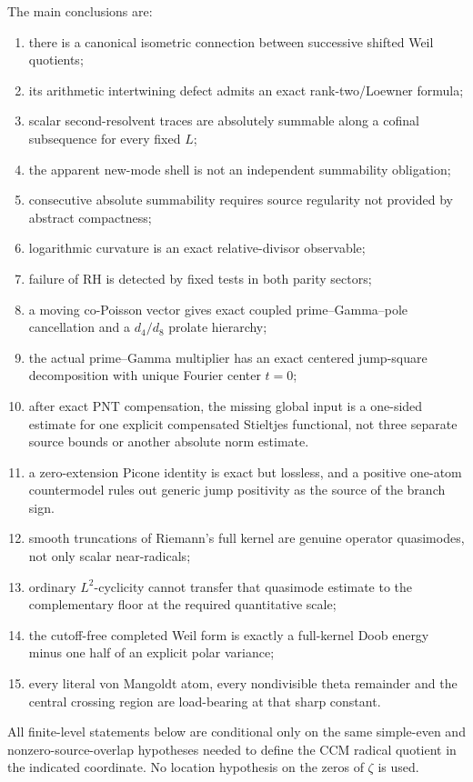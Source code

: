 \documentclass[11pt]{amsart}
\theoremstyle{definition}
\theoremstyle{remark}
\begin{document}
The main conclusions are:
\begin{enumerate}
\item there is a canonical isometric connection between successive shifted
Weil quotients;
\item its arithmetic intertwining defect admits an exact rank-two/Loewner
formula;
\item scalar second-resolvent traces are absolutely summable along a cofinal
subsequence for every fixed \(L\);
\item the apparent new-mode shell is not an independent summability
obligation;
\item consecutive absolute summability requires source regularity not
provided by abstract compactness;
\item logarithmic curvature is an exact relative-divisor observable;
\item failure of RH is detected by fixed tests in both parity sectors;
\item a moving co-Poisson vector gives exact coupled
prime--Gamma--pole cancellation and a \(d_4/d_8\) prolate hierarchy;
\item the actual prime--Gamma multiplier has an exact centered jump-square
decomposition with unique Fourier center \(t=0\);
\item after exact PNT compensation, the missing global input is a one-sided
estimate for one explicit compensated Stieltjes functional, not three
separate source bounds or another absolute norm estimate.
\item a zero-extension Picone identity is exact but lossless, and a
positive one-atom countermodel rules out generic jump positivity as the
source of the branch sign.
\item smooth truncations of Riemann's full kernel are genuine operator
quasimodes, not only scalar near-radicals;
\item ordinary \(L^2\)-cyclicity cannot transfer that quasimode estimate to
the complementary floor at the required quantitative scale;
\item the cutoff-free completed Weil form is exactly a full-kernel
Doob energy minus one half of an explicit polar variance;
\item every literal von Mangoldt atom, every nondivisible theta remainder
and the central crossing region are load-bearing at that sharp constant.
\end{enumerate}

All finite-level statements below are conditional only on the same
simple-even and nonzero-source-overlap hypotheses needed to define the CCM
radical quotient in the indicated coordinate.  No location hypothesis on
the zeros of \(\zeta\) is used.
\end{document}
